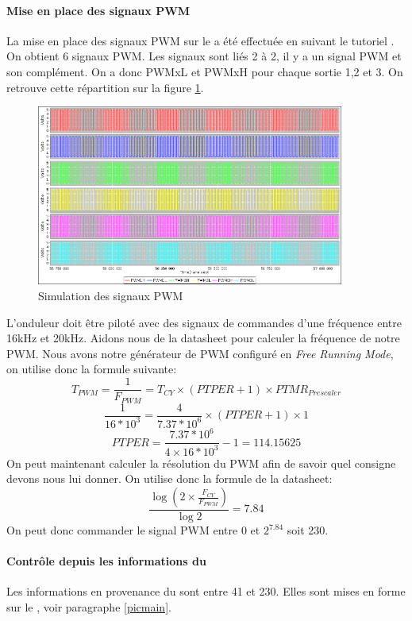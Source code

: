   			\paragraph{Mise en place des signaux PWM}
  			La mise en place des signaux PWM sur le \dspic a été effectuée en suivant le tutoriel \cite{PWMds}. On obtient 6 signaux PWM. Les signaux sont liés 2 à 2, il y a un signal PWM et son complément. On a donc PWMxL et PWMxH pour chaque sortie 1,2 et 3. On retrouve cette répartition sur la figure \ref{imgPWM}.\\
  			\begin{figure}[hb]\begin{center}
	  			\includegraphics[width=0.9\textwidth]{../Illus/pwm100.png}
	  			\caption{Simulation des signaux PWM}
	  			\label{imgPWM}
	  			\end{center}
  			\end{figure}
  			L'onduleur doit être piloté avec des signaux de commandes d'une fréquence entre 16kHz et 20kHz. Aidons nous de la datasheet \cite{DatasheetDSPIC} pour calculer la fréquence de notre PWM. Nous avons notre générateur de PWM configuré en \textit{Free Running Mode}, on utilise donc la formule suivante:
  			$$T_{PWM}=\frac{1}{F_{PWM}}=T_{CY}\times (PTPER+1)\times PTMR_{Prescaler}$$
  			$$\frac{1}{16*10^{3}}=\frac{4}{7.37*10^6}\times (PTPER+1)\times 1$$
  			$$PTPER=\frac{7.37*10^6}{4 \times 16*10^3}-1=114.15625 $$ 
  			On peut maintenant calculer la résolution du PWM afin de savoir quel consigne devons nous lui donner. On utilise donc la formule de la datasheet:
  			$$\frac{\log\left(2 \times \frac{F_{CY}}{F_{PWM}}\right)}{\log 2}=7.84$$
  			On peut donc commander le signal PWM entre 0 et $2^{7.84}$ soit 230.
			\paragraph{Contrôle depuis les informations du \pic}
			Les informations en provenance du \pic sont entre 41 et 230. Elles sont mises en forme sur le \pic, voir paragraphe \ref{picmain}.
